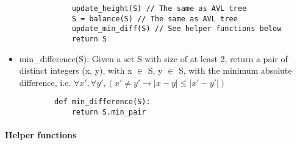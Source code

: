 \documentclass{article}
\begin{document}
\begin{itemize}
\begin{lstlisting}
            update_height(S) // The same as AVL tree
            S = balance(S) // The same as AVL tree
            update_min_diff(S) // See helper functions below
            return S
    \end{lstlisting}

          \newpage

    \item min\_difference(S): Given a set S with size of at least 2, return a pair of distinct integers (x, y),
          \newline
          with x $\in$ S, y $\in$ S, with the minimum absolute difference, i.e.
          \newline
          $\forall x', \forall y', (x' \neq y' \rightarrow |x - y| \leq |x' - y'|)$
          \begin{lstlisting}
        def min_difference(S):
            return S.min_pair
    \end{lstlisting}
\end{itemize}

\paragraph*{Helper functions}
\end{document}
